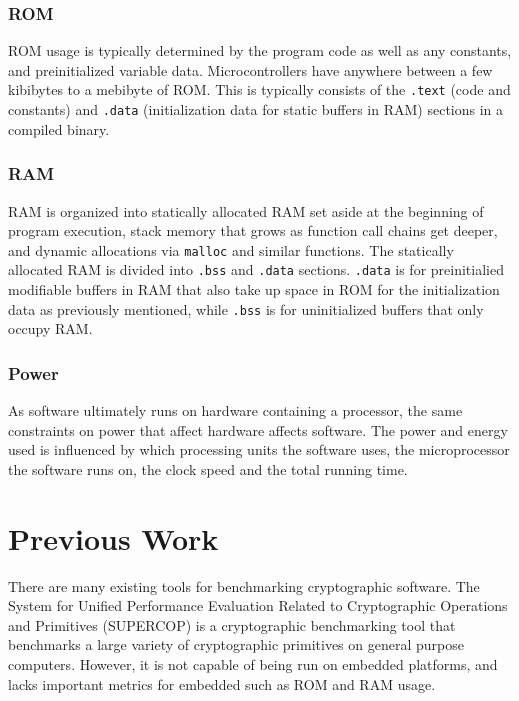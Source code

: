 \documentclass[twoside,11pt]{cergdoc}
\begin{document}
    \subsection{ROM}
ROM usage is typically determined by the program code as well as any constants,
and preinitialized variable data. Microcontrollers have anywhere between
a few kibibytes to a mebibyte of ROM. This is typically consists of the 
\texttt{.text} (code and constants) and \texttt{.data} (initialization data for
static buffers in RAM) sections in a compiled binary.

    \subsection{RAM}
RAM is organized into statically allocated RAM set aside at the beginning of
program execution, stack memory that grows as function call chains get deeper,
and dynamic allocations via \texttt{malloc} and similar functions. The statically
allocated RAM is divided into \texttt{.bss} and \texttt{.data} sections.
\texttt{.data} is for preinitialied modifiable buffers in RAM that also take up
space in ROM for the initialization data as previously mentioned, while
\texttt{.bss} is for uninitialized buffers that only occupy RAM.

    \subsection{Power}
As software ultimately runs on hardware containing a processor, the same
constraints on power that affect hardware affects software. The power and energy
used is influenced by which processing units the software uses, the
microprocessor the software runs on, the clock speed and the total running time.

\chapter{Previous Work}
There are many existing tools for benchmarking cryptographic software.
The System for Unified Performance Evaluation Related to Cryptographic Operations and Primitives
(SUPERCOP) is a cryptographic benchmarking tool that benchmarks a large variety
of cryptographic primitives on general purpose computers\cite{supercop}.
However, it is not capable of being run on embedded platforms, and lacks
important metrics for embedded such as ROM and RAM usage.
\end{document}
